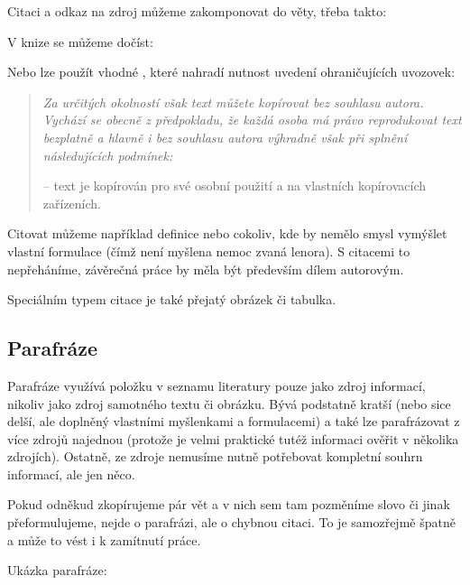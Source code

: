 Citaci a odkaz na zdroj můžeme zakomponovat do věty, třeba takto:
\bigskip

V knize \cite{autorskepravo} se můžeme dočíst:
\bigskip


Nebo lze použít vhodné , které nahradí nutnost uvedení ohraničujících uvozovek:


\begin{quote}\itshape
Za určitých okolností však text můžete kopírovat bez souhlasu autora. Vychází se obecně z předpokladu, že každá osoba má právo reprodukovat text bezplatně a hlavně i bez souhlasu autora výhradně však při splnění následujících podmínek:

{}-- text je kopírován pro své osobní použití a na vlastních kopírovacích zařízeních.\cite{autorskepravo}
\end{quote}

Citovat můžeme například definice nebo cokoliv, kde by nemělo smysl vymýšlet vlastní formulace (čímž není myšlena nemoc zvaná lenora). S citacemi to nepřeháníme, závěrečná práce by měla být především dílem autorovým.

Speciálním typem citace je také přejatý obrázek či tabulka.


\subsection{Parafráze}

Parafráze využívá položku v seznamu literatury pouze jako zdroj informací, nikoliv jako zdroj samotného textu či obrázku. Bývá podstatně kratší (nebo sice delší, ale doplněný vlastními myšlenkami a formulacemi) a také lze parafrázovat z více zdrojů najednou (protože je velmi praktické tutéž informaci ověřit v několika zdrojích). Ostatně, ze zdroje nemusíme nutně potřebovat kompletní souhrn informací, ale jen něco.

Pokud odněkud zkopírujeme pár vět a v nich sem tam pozměníme slovo či jinak přeformulujeme, nejde o parafrázi, ale o chybnou citaci. To je samozřejmě špatně a může to vést i k zamítnutí práce.

Ukázka parafráze:
\bigskip


